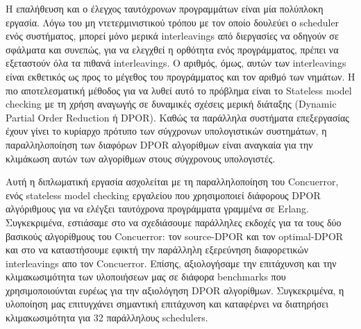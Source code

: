 Η επαλήθευση και ο έλεγχος ταυτόχρονων προγραμμάτων είναι μία πολύπλοκη εργασία. Λόγω του μη ντετερμινιστικού τρόπου με τον οποίο
δουλεύει ο scheduler ενός συστήματος, μπορεί μόνο μερικά interleavings από διεργασίες να οδηγούν σε σφάλματα και συνεπώς, 
για να ελεγχθεί η ορθότητα ενός προγράμματος, πρέπει να εξεταστούν όλα τα πιθανά interleavings. Ο αριθμός, όμως, αυτών των 
interleavings είναι εκθετικός ως προς το μέγεθος του προγράμματος και τον αριθμό των νημάτων. Η πιο αποτελεσματική μέθοδος για να λυθεί αυτό
το πρόβλημα είναι το Stateless model checking με τη χρήση αναγωγής σε δυναμικές
σχέσεις μερική διάταξης (Dynamic Partial Order Reduction ή DPOR). Καθώς τα παράλληλα συστήματα επεξεργασίας έχουν
γίνει το κυρίαρχο πρότυπο των σύγχρονων υπολογιστικών συστημάτων, η παραλληλοποίηση των διαφόρων DPOR αλγορίθμων είναι 
αναγκαία για την κλιμάκωση αυτών των αλγορίθμων στους σύγχρονους υπολογιστές.

Αυτή η διπλωματική εργασία ασχολείται με τη παραλληλοποίηση του Concuerror, ενός stateless model checking εργαλείου που χρησιμοποιεί
διάφορους DPOR αλγόριθμους για να ελέγξει ταυτόχρονα προγράμματα γραμμένα σε Erlang. Συγκεκριμένα, εστιάσαμε στο να σχεδιάσουμε 
παράλληλες εκδοχές για τα τους δύο βασικούς αλγορίθμους του Concuerror: τον source-DPOR και τον optimal-DPOR και στο
να καταστήσουμε εφικτή την παράλληλη εξερεύνηση διαφορετικών interleavings απο τον Concuerror.
Επίσης, αξιολογήσαμε την επιτάχυνση και την κλιμακωσιμότητα των υλοποιήσεων μας σε διάφορα benchmarks που 
χρησιμοποιούνται ευρέως για την αξιολόγηση DPOR αλγορίθμων. 
Συγκεκριμένα, η υλοποίηση μας επιτυγχάνει σημαντική επιτάχυνση και καταφέρνει να διατηρήσει κλιμακωσιμότητα για 32 παράλληλους schedulers.

